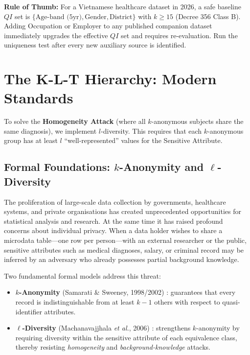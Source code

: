 \begin{svgraybox}
\textbf{Rule of Thumb:} For a Vietnamese healthcare dataset in 2026, a safe baseline $QI$ set is $\{\text{Age-band (5yr)}, \text{Gender}, \text{District}\}$ with $k \geq 15$ (Decree 356 Class B). Adding Occupation or Employer to any published companion dataset immediately upgrades the effective $QI$ set and requires re-evaluation. Run the uniqueness test after every new auxiliary source is identified.
\end{svgraybox}

\section{The K-L-T Hierarchy: Modern Standards}
\label{sec:klt_hierarchy}

To solve the \textbf{Homogeneity Attack} (where all $k$-anonymous subjects share the same diagnosis), we implement $l$-diversity. This requires that each $k$-anonymous group has at least $l$ ``well-represented'' values for the Sensitive Attribute.

\subsection{Formal Foundations: $k$-Anonymity and $\ell$-Diversity}
\label{sec:formal_foundations}

The proliferation of large-scale data collection by governments, healthcare systems, and private organisations has created unprecedented opportunities for statistical analysis and research. At the same time it has raised profound concerns about individual privacy. When a data holder wishes to share a microdata table---one row per person---with an external researcher or the public, sensitive attributes such as medical diagnoses, salary, or criminal record may be inferred by an adversary who already possesses partial background knowledge.

Two fundamental formal models address this threat:

\begin{itemize}
  \item \textbf{$k$-Anonymity} (Samarati \& Sweeney, 1998/2002) \cite{sweeney2002}: guarantees that every record is indistinguishable from at least $k-1$ others with respect to quasi-identifier attributes.
  \item \textbf{$\ell$-Diversity} (Machanavajjhala \emph{et al.}, 2006) \cite{machanavajjhala2007}: strengthens $k$-anonymity by requiring diversity within the sensitive attribute of each equivalence class, thereby resisting \emph{homogeneity} and \emph{background-knowledge} attacks.
\end{itemize}


